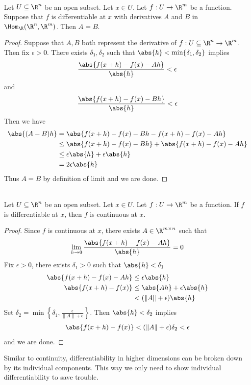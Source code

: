 \documentclass[a4paper]{article}
\begin{document}
\begin{prp}{}{}\\
Let $U\subseteq\R^n$ be an open subset. Let $x\in U$. Let $f:U\to\R^m$ be a function. Suppose that $f$ is differentiable at $x$ with derivatives $A$ and $B$ in $\Hom_\R(\R^n,\R^m)$. Then $A=B$. 
\begin{proof}
Suppose that $A,B$ both represent the derivative of $f:U\subseteq\R^n\to\R^m$. Then fix $\epsilon>0$. There exists $\delta_1,\delta_2$ such that $\abs{h}<\min\{\delta_1,\delta_2\}$ implies $$\frac{\abs{f(x+h)-f(x)-Ah}}{\abs{h}}<\epsilon$$ and $$\frac{\abs{f(x+h)-f(x)-Bh}}{\abs{h}}<\epsilon$$ Then we have 
\begin{align*}
\abs{(A-B)h}&=\abs{f(x+h)-f(x)-Bh-f(x+h)-f(x)-Ah}\\
&\leq\abs{f(x+h)-f(x)-Bh}+\abs{f(x+h)-f(x)-Ah}\\
&\leq\epsilon\abs{h}+\epsilon\abs{h}\\
&=2\epsilon\abs{h}
\end{align*}
Thus $A=B$ by definition of limit and we are done. 
\end{proof}
\end{prp}

\begin{prp}{}{}\\
Let $U\subseteq\R^n$ be an open subset. Let $x\in U$. Let $f:U\to\R^m$ be a function. If $f$ is differentiable at $x$, then $f$ is continuous at $x$. 
\begin{proof}
Since $f$ is continuous at $x$, there exists $A\in\R^{m\times n}$ such that $$\lim_{h\to 0}\frac{\abs{f(x+h)-f(x)-Ah}}{\abs{h}}=0$$ Fix $\epsilon>0$, there exists $\delta_1>0$ such that $\abs{h}<\delta_1$ 
\begin{align*}
\abs{f(x+h)-f(x)-Ah}&\leq\epsilon\abs{h}\\
\abs{f(x+h)-f(x)}&\leq\abs{Ah}+\epsilon\abs{h}\\
&<(\|A\|+\epsilon)\abs{h}
\end{align*}
Set $\delta_2=\min\left\{\delta_1,\frac{\epsilon}{\|A\|+\epsilon}\right\}$. Then $\abs{h}<\delta_2$ implies $$\abs{f(x+h)-f(x)}<(\|A\|+\epsilon)\delta_2<\epsilon$$ and we are done. 
\end{proof}
\end{prp}

Similar to continuity, differentiability in higher dimensions can be broken down by its individual components. This way we only need to show individual differentiability to save trouble. 
\end{document}
